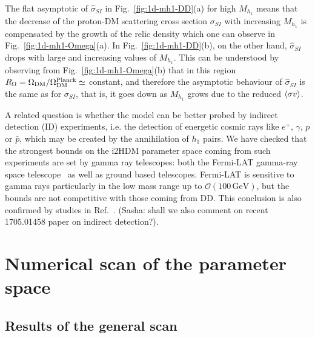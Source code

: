 \documentclass[12pt,a4paper]{article}
\newcommand {\blue} {\color{blue}}
\newcommand {\red} {\color{red}}
\newcommand{\tcr}[1]{{\red  #1}}
\newcommand{\giac}[2]{{\blue #1 #2}}
\begin{document}
The flat asymptotic of $\hat{\sigma}_{SI}$ in Fig.~\ref{fig:1d-mh1-DD}(a)
for high $M_{h_1}$ means that the decrease of the 
proton-DM scattering cross section ${\sigma}_{SI}$ with increasing $M_{h_1}$ is compensated by the 
growth of the relic density which one can observe in Fig.~\ref{fig:1d-mh1-Omega}(a).
{In Fig.~\ref{fig:1d-mh1-DD}(b), on the other hand, $\hat{\sigma}_{SI}$
drops with large and increasing values of $M_{h_1}$.
This can be understood by observing from Fig.~\ref{fig:1d-mh1-Omega}(b) that in this region
$R_\Omega = \Omega_{\rm DM}/\Omega^{\rm Planck}_{\rm DM}\simeq$ constant, and therefore 
the asymptotic behaviour of $\hat{\sigma}_{SI}$ is the same as for ${\sigma}_{SI}$,
that is, it goes down as $M_{h_1}$ grows due to the reduced $\mathinner{\langle{\sigma v}\rangle}$.}




A related question is whether the model can be better probed by   indirect detection (ID) experiments, i.e. the detection of   energetic cosmic rays like $e^+$, $\gamma$, $p$ or $\bar{p}$, which may be created by the annihilation of $h_1$ pairs.
We have checked  that the strongest bounds on the i2HDM parameter space
 coming from such experiments are set by gamma ray telescopes: both the Fermi-LAT gamma-ray space telescope~\cite{Ackermann:2011wa} as well as ground based telescopes. Fermi-LAT is sensitive to gamma rays particularly in the low mass range  up to $\mathcal{O}(100\,\mathrm{GeV})$, but the bounds are not competitive with those coming from DD. 
This conclusion is also confirmed by studies in Ref.~\cite{Arhrib:2013ela}.
\tcr{(Sasha: shall we also comment on recent 1705.01458 paper on indirect detection?)}.
 


%
\section{Numerical scan of the parameter space\label{sec:num-scan}}

\subsection{Results of the general scan}
\end{document}
